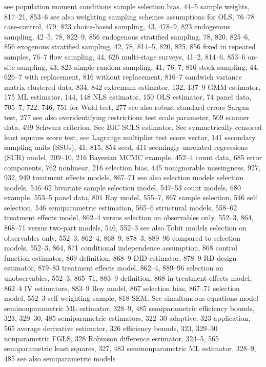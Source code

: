 see population moment conditions sample selection bias, 44–5
sample weights, 817–21, 853–6
see also weighting sampling schemes
assumptions for OLS, 76–78
case-control, 479, 823
choice-based sampling, 43, 478–9, 823 endogenous sampling, 42–5, 78, 822–9, 856 endogenous stratified sampling, 78, 820, 825–6,
856
exogenous stratified sampling, 42, 78, 814–5, 820,
825, 856
fixed in repeated samples, 76–7
flow sampling, 44, 626
multi-stage surveys, 41–2, 814–6, 853–6 on-site sampling, 43, 823
simple random sampling, 41, 76–7, 816 stock sampling, 44, 626–7
with replacement, 816
without replacement, 816–7
sandwich variance matrix clustered data, 834, 842 extremum estimator, 132, 137–9 GMM estimator, 175
ML estimator, 144, 148
NLS estimator, 150
OLS estimator, 74
panel data, 705–7, 722, 746, 751 for Wald test, 277
see also robust standard errors Sargan test, 277
see also overidentifying restrictions test scale parameter, 509
scanner data, 499
Schwarz criterion. See BIC
SCLS estimator. See symmetrically censored least squares
score test, see Lagrange multiplier test
score vector, 141
secondary sampling units (SSUs), 41, 815, 854 seed, 411
seemingly unrelated regressions (SUR) model, 209–10, 216
Bayesian MCMC example, 452–4 count data, 685
error components, 762
nonlinear, 216
selection bias, 445
nonignorable missingness, 927, 932, 940 treatment effects models, 867–71
see also selection models
selection models, 546–62
bivariate sample selection model, 547–53
count models, 680
example, 553–5
panel data, 801
Roy model, 555–7, 867
sample selection, 546
self selection, 546
semiparametric estimation, 565–6
structural models, 558–62
treatment effects model, 862–4
versus selection on observables only, 552–3, 864,
868–71
versus two-part models, 546, 552–3 see also Tobit models
selection on observables only, 552–3, 862–4, 868–9, 878–3, 889–96
compared to selection models, 552–3, 864, 871 conditional independence assumption, 868 control function estimator, 869
definition, 868–9
DID estimator, 878–9
RD design estimator, 879–83
treatment effects model, 862–4, 889–96
selection on unobservables, 552–3, 865–71, 883–9 definition, 868
in treatment effects model, 862–4
IV estimators, 883–9
Roy model, 867 selection bias, 867–71 selection model, 552–3
self-weighting sample, 818
SEM. See simultaneous equations model seminonparametric ML estimator, 328–9, 485 semiparametric efficiency bounds, 323, 329–30, 485 semiparametric estimators, 322–30
adaptive, 323
application, 565
average derivative estimator, 326
efficiency bounds, 323, 329–30 nonparametric FGLS, 328
Robinson difference estimator, 324–5, 565 semiparametric least squares, 327, 483 seminonparametric ML estimator, 328–9, 485 see also semiparametric models
